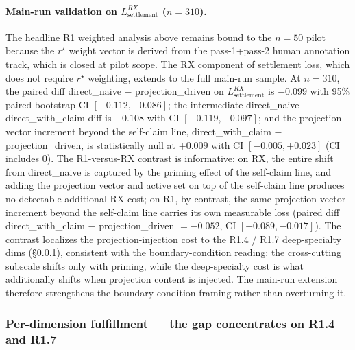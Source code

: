 \paragraph*{Main-run validation on $L_{\text{settlement}}^{RX}$ ($n = 310$).} The headline R1 weighted analysis above remains bound to the $n = 50$ pilot because the $r^\star$ weight vector is derived from the pass-1+pass-2 human annotation track, which is closed at pilot scope. The RX component of settlement loss, which does not require $r^\star$ weighting, extends to the full main-run sample. At $n = 310$, the paired diff direct\_naive $-$ projection\_driven on $L_{\text{settlement}}^{RX}$ is $-0.099$ with 95\% paired-bootstrap CI $[-0.112, -0.086]$; the intermediate direct\_naive $-$ direct\_with\_claim diff is $-0.108$ with CI $[-0.119, -0.097]$; and the projection-vector increment beyond the self-claim line, direct\_with\_claim $-$ projection\_driven, is statistically null at $+0.009$ with CI $[-0.005, +0.023]$ (CI includes $0$). The R1-versus-RX contrast is informative: on RX, the entire shift from direct\_naive is captured by the priming effect of the self-claim line, and adding the projection vector and active set on top of the self-claim line produces no detectable additional RX cost; on R1, by contrast, the same projection-vector increment beyond the self-claim line carries its own measurable loss (paired diff direct\_with\_claim $-$ projection\_driven $= -0.052$, CI $[-0.089, -0.017]$). The contrast localizes the projection-injection cost to the R1.4 / R1.7 deep-specialty dims (\S\ref{sec:results:exp2:by_dim}), consistent with the boundary-condition reading: the cross-cutting subscale shifts only with priming, while the deep-specialty cost is what additionally shifts when projection content is injected. The main-run extension therefore strengthens the boundary-condition framing rather than overturning it.

\subsubsection{Per-dimension fulfillment --- the gap concentrates on R1.4 and R1.7}
\label{sec:results:exp2:by_dim}

